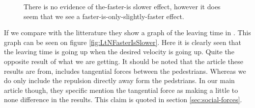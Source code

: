 \begin{figure}[h]
\caption{There is no evidence of the-faster-is slower effect, however it does 
seem that we see a faster-is-only-slightly-faster effect.}
\label{fig:isfasterslower}
\end{figure}
If we compare with the litterature they show a graph of the leaving time in 
\cite{helbing00}. This graph can be seen on figure 
\ref{fig:LtNFasterIsSlower}. Here it is clearly seen that the leaving time is 
going up when the desired velocity is going up. Quite the opposite result of 
what we are getting. It should be noted that the article these results are 
from, includes tangential forces between the pedestrians. Whereas we do only 
include the repulsion directly away form the pedstrians. In our main article 
\cite{self-org} though, they specific mention the tangential force as making a 
little to none difference in the results. This claim is quoted in section 
\ref{sec:social-forces}.
